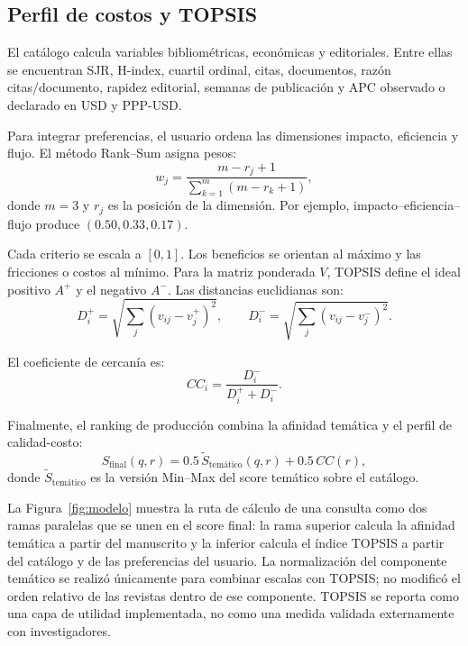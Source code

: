 \documentclass[12pt,a4paper]{article}
\begin{document}
\subsection{Perfil de costos y TOPSIS}
El catálogo calcula variables bibliométricas, económicas y editoriales. Entre ellas se encuentran SJR, H-index, cuartil ordinal, citas, documentos, razón citas/documento, rapidez editorial, semanas de publicación y APC observado o declarado en USD y PPP-USD.

Para integrar preferencias, el usuario ordena las dimensiones impacto, eficiencia y flujo. El método Rank--Sum asigna pesos:
\begin{equation}
w_j=\frac{m-r_j+1}{\sum_{k=1}^{m}(m-r_k+1)},
\end{equation}
\noindent donde $m=3$ y $r_j$ es la posición de la dimensión. Por ejemplo, impacto--eficiencia--flujo produce $(0.50,0.33,0.17)$.

Cada criterio se escala a $[0,1]$. Los beneficios se orientan al máximo y las fricciones o costos al mínimo. Para la matriz ponderada $V$, TOPSIS define el ideal positivo $A^+$ y el negativo $A^-$. Las distancias euclidianas son:
\begin{equation}
D_i^+=\sqrt{\sum_j(v_{ij}-v_j^+)^2},\qquad
D_i^-=\sqrt{\sum_j(v_{ij}-v_j^-)^2}.
\end{equation}

El coeficiente de cercanía es:
\begin{equation}
CC_i=\frac{D_i^-}{D_i^++D_i^-}.
\end{equation}

Finalmente, el ranking de producción combina la afinidad temática y el perfil de calidad-costo:
\begin{equation}
S_{\mathrm{final}}(q,r)=0.5\,\widetilde{S}_{\text{temático}}(q,r)+0.5\,CC(r),
\end{equation}
\noindent donde $\widetilde{S}_{\text{temático}}$ es la versión Min--Max del score temático sobre el catálogo.

La Figura~\ref{fig:modelo} muestra la ruta de cálculo de una consulta como dos ramas paralelas que se unen en el score final: la rama superior calcula la afinidad temática a partir del manuscrito y la inferior calcula el índice TOPSIS a partir del catálogo y de las preferencias del usuario. La normalización del componente temático se realizó únicamente para combinar escalas con TOPSIS; no modificó el orden relativo de las revistas dentro de ese componente. TOPSIS se reporta como una capa de utilidad implementada, no como una medida validada externamente con investigadores.
\end{document}
